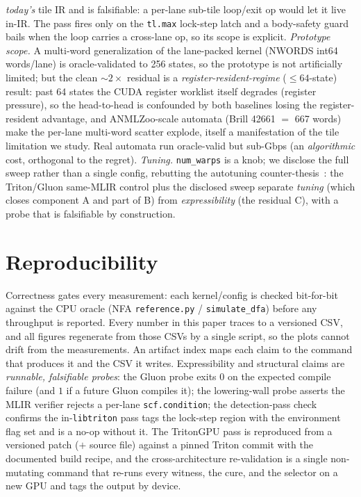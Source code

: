 \documentclass[acmsmall,review,anonymous]{acmart}
\begin{document}
\emph{today's} tile IR and is falsifiable: a per-lane sub-tile loop/exit op would let it live in-IR. The
pass fires only on the \texttt{tl.max} lock-step latch and a body-safety guard bails when the loop carries
a cross-lane op, so its scope is explicit. \emph{Prototype scope.} A multi-word
generalization of the lane-packed kernel (NWORDS int64 words/lane) is oracle-validated to 256 states,
so the prototype is not artificially limited; but the clean ${\sim}2\times$ residual is a
\emph{register-resident-regime} ($\le 64$-state) result: past 64 states the CUDA register worklist
itself degrades (register pressure), so the head-to-head is confounded by both baselines losing the
register-resident advantage, and ANMLZoo-scale automata (Brill 42661 $=$ 667 words) make the per-lane
multi-word scatter explode, itself a manifestation of the tile limitation we study. Real automata run
oracle-valid but sub-Gbps (an \emph{algorithmic} cost, orthogonal to the regret). \emph{Tuning.} \texttt{num\_warps} is a knob; we
disclose the full sweep rather than a single config, rebutting the autotuning
counter-thesis~\cite{ringlein2025}: the Triton/Gluon same-MLIR control plus the disclosed sweep
separate \emph{tuning} (which closes component A and part of B) from \emph{expressibility} (the
residual C), with a probe that is falsifiable by construction.

\section{Reproducibility}
Correctness gates every measurement: each kernel/config is checked bit-for-bit against the CPU oracle
(NFA \texttt{reference.py} / \texttt{simulate\_dfa}) before any throughput is reported. Every number in
this paper traces to a versioned CSV, and all figures regenerate from those CSVs by a single script, so
the plots cannot drift from the measurements. An artifact index maps each claim to the command that
produces it and the CSV it writes. Expressibility and structural claims are \emph{runnable, falsifiable
probes}: the Gluon probe exits $0$ on the expected compile failure (and $1$ if a future Gluon compiles
it); the lowering-wall probe asserts the MLIR verifier rejects a per-lane \texttt{scf.condition}; the
detection-pass check confirms the in-\texttt{libtriton} pass tags the lock-step region with the
environment flag set and is a no-op without it. The TritonGPU pass is reproduced from a versioned patch
($+$ source file) against a pinned Triton commit with the documented build recipe, and the
cross-architecture re-validation is a single non-mutating command that re-runs every witness, the cure,
and the selector on a new GPU and tags the output by device.
\end{document}
